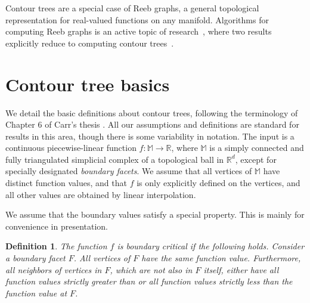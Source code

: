 \documentclass[11pt]{article}
\newtheorem{definition}[theorem]{Definition}
\theoremstyle{definition}
\newcommand{\MM}{\mathbb{M}}
\newcommand{\RR}{\mathbb{R}}
\newcommand{\Sec}[1]{\hyperref[sec:#1]{\S\ref*{sec:#1}}} %
\begin{document}
Contour trees are a special case of Reeb graphs, a general topological representation for real-valued functions
on any manifold. Algorithms for computing Reeb graphs
is an active topic of research~\cite{sk-crgacs-91,cehnp-lrbm-03,PaScBr07,DoNa09,HaWaWe10,Pa12}, where
two results explicitly reduce to computing contour trees~\cite{TiGySi09,DoNa13}.



\section{Contour tree basics} \label{sec:basics}

We detail the basic definitions about contour trees, following the terminology of Chapter 6 of Carr's thesis \cite{c-tmi-04}.
All our assumptions and definitions
are standard for results in this area, though there is some variability in notation.
The input is a continuous piecewise-linear function $f:\MM \to \RR$, where $\MM$ is a simply connected and fully triangulated simplicial complex of a topological ball in $\RR^d$,
except for specially designated \emph{boundary facets}. We assume that all vertices of $\MM$ have distinct function values, 
and that $f$ is only explicitly defined on the vertices, and all other values are obtained by linear interpolation. 

We assume that the boundary values satisfy a special property. This is mainly for convenience
in presentation.

\begin{definition} \label{def:bound} The function $f$ is \emph{boundary critical} if the following holds.
Consider a boundary facet $F$. All vertices of $F$ have the same function value. Furthermore, all
neighbors of vertices in $F$, which are not also in $F$ itself, 
either have all function values strictly greater than or all function values strictly less than the function value at $F$.
\end{definition}
\end{document}
